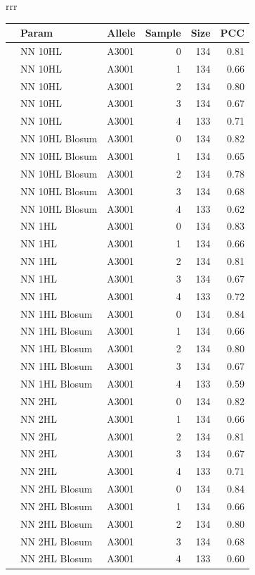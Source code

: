 \documentclass[presentation]{beamer}   %
\begin{document}
\begin{frame}
\begin{table}[hb]
\begin{center}
\begin{tabular}{rrr}
\begin{tabular}{rllrrr}
  \hline
 & Param & Allele & Sample & Size & PCC \\ 
  \hline
   & NN 10HL & A3001 &   0 & 134 & 0.81 \\ 
   & NN 10HL & A3001 &   1 & 134 & 0.66 \\ 
   & NN 10HL & A3001 &   2 & 134 & 0.80 \\ 
   & NN 10HL & A3001 &   3 & 134 & 0.67 \\ 
   & NN 10HL & A3001 &   4 & 133 & 0.71 \\ 
\hline
   & NN 10HL Blosum & A3001 &   0 & 134 & 0.82 \\ 
   & NN 10HL Blosum & A3001 &   1 & 134 & 0.65 \\ 
   & NN 10HL Blosum & A3001 &   2 & 134 & 0.78 \\ 
   & NN 10HL Blosum & A3001 &   3 & 134 & 0.68 \\ 
   & NN 10HL Blosum & A3001 &   4 & 133 & 0.62 \\ 
\hline
   & NN 1HL & A3001 &   0 & 134 & 0.83 \\ 
   & NN 1HL & A3001 &   1 & 134 & 0.66 \\ 
   & NN 1HL & A3001 &   2 & 134 & 0.81 \\ 
   & NN 1HL & A3001 &   3 & 134 & 0.67 \\ 
   & NN 1HL & A3001 &   4 & 133 & 0.72 \\ 
\hline
   & NN 1HL Blosum & A3001 &   0 & 134 & 0.84 \\ 
   & NN 1HL Blosum & A3001 &   1 & 134 & 0.66 \\ 
   & NN 1HL Blosum & A3001 &   2 & 134 & 0.80 \\ 
   & NN 1HL Blosum & A3001 &   3 & 134 & 0.67 \\ 
   & NN 1HL Blosum & A3001 &   4 & 133 & 0.59 \\ 
\hline
   & NN 2HL & A3001 &   0 & 134 & 0.82 \\ 
   & NN 2HL & A3001 &   1 & 134 & 0.66 \\ 
   & NN 2HL & A3001 &   2 & 134 & 0.81 \\ 
   & NN 2HL & A3001 &   3 & 134 & 0.67 \\ 
   & NN 2HL & A3001 &   4 & 133 & 0.71 \\ 
\hline
   & NN 2HL Blosum & A3001 &   0 & 134 & 0.84 \\ 
   & NN 2HL Blosum & A3001 &   1 & 134 & 0.66 \\ 
   & NN 2HL Blosum & A3001 &   2 & 134 & 0.80 \\ 
   & NN 2HL Blosum & A3001 &   3 & 134 & 0.68 \\ 
   & NN 2HL Blosum & A3001 &   4 & 133 & 0.60 \\ 
   \hline
\end{tabular}


\end{tabular}
\end{center}
\end{table}
\end{frame}
\end{document}
